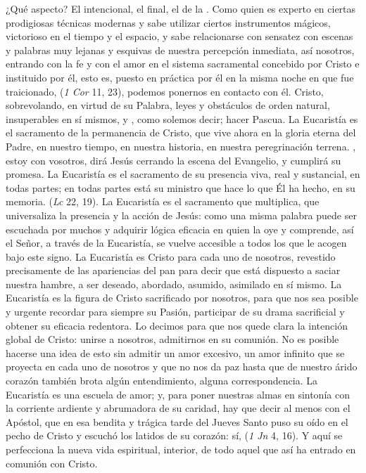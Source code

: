 \begin{body}
¿Qué aspecto? El intencional, el final, el de la . Como quien es experto en ciertas prodigiosas técnicas modernas y sabe utilizar ciertos instrumentos mágicos, victorioso en el tiempo y el espacio, y sabe relacionarse con sensatez con escenas y palabras muy lejanas y esquivas de nuestra percepción inmediata, así nosotros, entrando con la fe y con el amor en el sistema sacramental concebido por Cristo e instituido por él, esto es, puesto en práctica por él en la misma noche en que fue traicionado,  (\textit{1 Cor} 11, 23), podemos ponernos en contacto con él. Cristo, sobrevolando, en virtud de su Palabra, leyes y obstáculos de orden natural, insuperables en sí mismos, y , como solemos decir; hacer Pascua. La Eucaristía es el sacramento de la permanencia de Cristo, que vive ahora en la gloria eterna del Padre, en nuestro tiempo, en nuestra historia, en nuestra peregrinación terrena. , estoy con vosotros, dirá Jesús cerrando la escena del Evangelio, y cumplirá su promesa. La Eucaristía es el sacramento de su presencia viva, real y sustancial, en todas partes; en todas partes está su ministro que hace lo que Él ha hecho, en su memoria.  (\textit{Lc} 22, 19). La Eucaristía es el sacramento que multiplica, que universaliza la presencia y la acción de Jesús: como una misma palabra puede ser escuchada por muchos y adquirir lógica eficacia en quien la oye y comprende, así el Señor, a través de la Eucaristía, se vuelve accesible a todos los que le acogen bajo este signo. La Eucaristía es Cristo para cada uno de nosotros, revestido precisamente de las apariencias del pan para decir que está dispuesto a saciar nuestra hambre, a ser deseado, abordado, asumido, asimilado en sí mismo. La Eucaristía es la figura de Cristo sacrificado por nosotros, para que nos sea posible y urgente recordar para siempre su Pasión, participar de su drama sacrificial y obtener su eficacia redentora. Lo decimos para que nos quede clara la intención global de Cristo: unirse a nosotros, admitirnos en su comunión. No es posible hacerse una idea de esto sin admitir un amor excesivo, un amor infinito que se proyecta en cada uno de nosotros y que no nos da paz hasta que de nuestro árido corazón también brota algún entendimiento, alguna correspondencia. La Eucaristía es una escuela de amor; y, para poner nuestras almas en sintonía con la corriente ardiente y abrumadora de su caridad, hay que decir al menos con el Apóstol, que en esa bendita y trágica tarde del Jueves Santo puso su oído en el pecho de Cristo y escuchó los latidos de su corazón: sí,  (\textit{1 Jn} 4, 16). Y aquí se perfecciona la nueva vida espiritual, interior, de todo aquel que así ha entrado en comunión con Cristo. 


\end{body}
